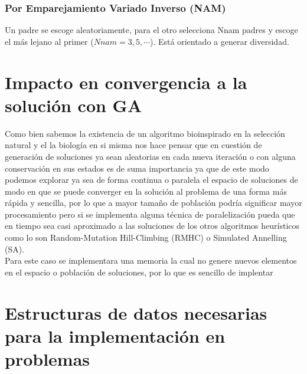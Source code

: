 \documentclass[10pt]{article}
\begin{document}
\subsubsection{Por Emparejamiento Variado Inverso (NAM)}
Un padre se escoge aleatoriamente, para el otro selecciona Nnam padres y escoge el más lejano al primer (\(\displaystyle Nnam=3,5,\cdots\)). Está orientado a generar diversidad.
\section{Impacto en convergencia a la solución con GA}
Como bien sabemos la existencia de un algoritmo bioinspirado en la selección natural y el la biología en si misma nos hace pensar que en cuestión de generación de soluciones ya sean aleatorias en cada nueva iteración o con alguna conservación en sus estados es de suma importancia ya que de este modo podemos explorar ya sea de forma continua o paralela el espacio de soluciones de modo en que se puede converger en la solución al problema de una forma más rápida y sencilla, por lo que a mayor tamaño de población podría significar mayor procesamiento pero si se implementa alguna técnica de paralelización pueda que en tiempo sea casi aproximado a las soluciones de los otros algoritmos heurísticos como lo son Random-Mutation Hill-Climbing (RMHC) o Simulated Annelling (SA).
\\
Para este caso se implementara una memoria la cual no genere nuevos elementos en el espacio o población de soluciones, por lo que es sencillo de implentar


\section{Estructuras de datos necesarias para la implementación en problemas}
\end{document}

